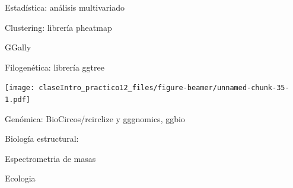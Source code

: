 \documentclass[ignorenonframetext,]{beamer}
\begin{document}
\begin{frame}{Estadística: análisis multivariado}
\protect\hypertarget{estaduxedstica-anuxe1lisis-multivariado}{}

\end{frame}

\begin{frame}{Clustering: librería pheatmap}
\protect\hypertarget{clustering-libreruxeda-pheatmap}{}

\end{frame}

\begin{frame}{GGally}
\protect\hypertarget{ggally}{}

\end{frame}

\begin{frame}{Filogenética: librería ggtree}
\protect\hypertarget{filogenuxe9tica-libreruxeda-ggtree}{}

\texttt{[image: claseIntro\_practico12\_files/figure-beamer/unnamed-chunk-35-1.pdf]}

\end{frame}

\begin{frame}{Genómica: BioCircos/rcirclize y gggnomics, ggbio}
\protect\hypertarget{genuxf3mica-biocircosrcirclize-y-gggnomics-ggbio}{}

\end{frame}

\begin{frame}{Biología estructural:}
\protect\hypertarget{biologuxeda-estructural}{}

\end{frame}

\begin{frame}{Espectrometria de masas}
\protect\hypertarget{espectrometria-de-masas}{}

\end{frame}

\begin{frame}{Ecologia}
\protect\hypertarget{ecologia}{}

\end{frame}
\end{document}
